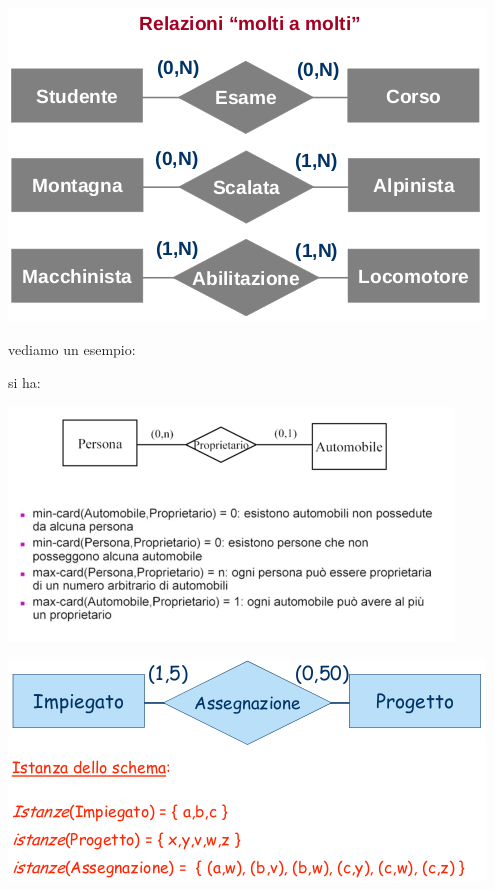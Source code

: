 \documentclass[a4paper,12pt, oneside]{book}
\begin{document}
\begin{center}
\includegraphics[scale=0.6]{img/er5.png}
\end{center}
vediamo un esempio:
\begin{esempio}
si ha:
\begin{center}
\includegraphics[scale=0.8]{img/er8.png}
\end{center}

\end{esempio}
\begin{center}
\includegraphics[scale=0.8]{img/er9.png}
\end{center}
\end{document}
